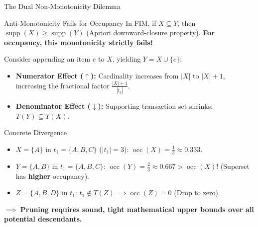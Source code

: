 \documentclass[aspectratio=169,10pt]{beamer}
\newcommand{\supp}{\operatorname{supp}}
\newcommand{\occ}{\operatorname{occ}}
\begin{document}
\begin{frame}{The Dual Non-Monotonicity Dilemma}
  \begin{alertblock}{Anti-Monotonicity Fails for Occupancy}
    In FIM, if $X \subseteq Y$, then $\supp(X) \ge \supp(Y)$ (Apriori downward-closure property).
    \textbf{For occupancy, this monotonicity strictly fails!}
  \end{alertblock}

  \vspace{0.3cm}
  Consider appending an item $e$ to $X$, yielding $Y = X \cup \{e\}$:
  \begin{itemize}
    \item \textbf{Numerator Effect ($\uparrow$):} Cardinality increases from $|X|$ to $|X| + 1$, increasing the fractional factor $\frac{|X|+1}{|t_q|}$.
    \item \textbf{Denominator Effect ($\downarrow$):} Supporting transaction set shrinks: $T(Y) \subseteq T(X)$.
  \end{itemize}

  \begin{exampleblock}{Concrete Divergence}
    \begin{itemize}
      \item $X = \{A\}$ in $t_1 = \{A, B, C\}$ ($|t_1|=3$): $\occ(X) = \frac{1}{3} \approx 0.333$.
      \item $Y = \{A, B\}$ in $t_1 = \{A, B, C\}$: $\occ(Y) = \frac{2}{3} \approx 0.667 > \occ(X)$! (Superset has \textbf{higher} occupancy).
      \item $Z = \{A, B, D\}$ in $t_1$: $t_1 \notin T(Z) \implies \occ(Z) = 0$ (Drop to zero).
    \end{itemize}
  \end{exampleblock}
  $\implies$ \textbf{Pruning requires sound, tight mathematical upper bounds over all potential descendants.}
\end{frame}
\end{document}
